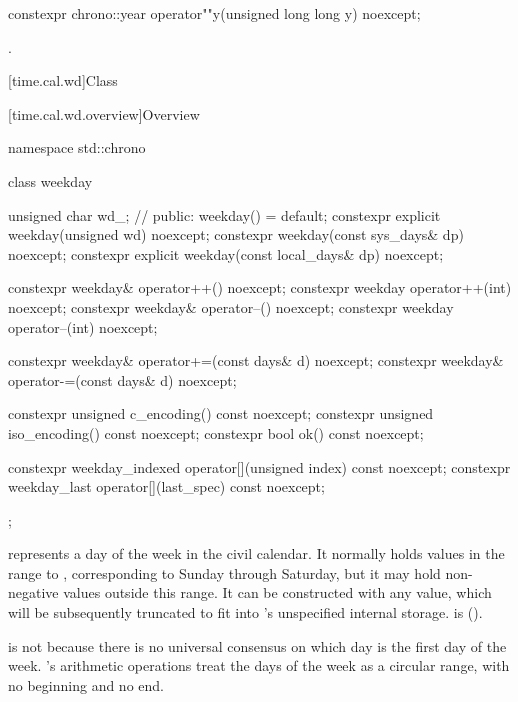 %
\begin{itemdecl}
constexpr chrono::year operator""y(unsigned long long y) noexcept;
\end{itemdecl}

\begin{itemdescr}
\pnum
\returns
{}.
\end{itemdescr}

[time.cal.wd]{Class }

[time.cal.wd.overview]{Overview}

\begin{codeblock}
namespace std::chrono {
  class weekday {
    unsigned char wd_;          // \expos
  public:
    weekday() = default;
    constexpr explicit weekday(unsigned wd) noexcept;
    constexpr weekday(const sys_days& dp) noexcept;
    constexpr explicit weekday(const local_days& dp) noexcept;

    constexpr weekday& operator++()    noexcept;
    constexpr weekday  operator++(int) noexcept;
    constexpr weekday& operator--()    noexcept;
    constexpr weekday  operator--(int) noexcept;

    constexpr weekday& operator+=(const days& d) noexcept;
    constexpr weekday& operator-=(const days& d) noexcept;

    constexpr unsigned c_encoding() const noexcept;
    constexpr unsigned iso_encoding() const noexcept;
    constexpr bool ok() const noexcept;

    constexpr weekday_indexed operator[](unsigned index) const noexcept;
    constexpr weekday_last    operator[](last_spec) const noexcept;
  };
}
\end{codeblock}

\pnum
{} represents a day of the week in the civil calendar.
It normally holds values in the range  to ,
corresponding to Sunday through Saturday, but
it may hold non-negative values outside this range.
It can be constructed with any  value,
which will be subsequently truncated to fit into 's unspecified internal storage.
 is  ().
\begin{note}
 is not
because there is no universal consensus on which day is the first day of the week.
's arithmetic operations treat the days of the week as a circular range,
with no beginning and no end.
\end{note}

